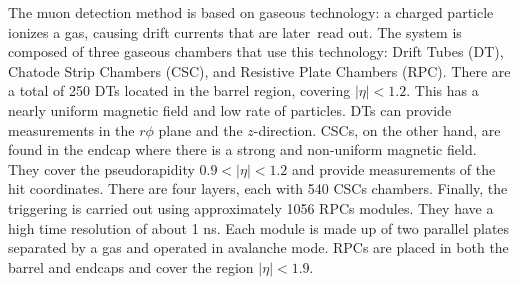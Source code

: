 The muon detection method is based on gaseous technology: a charged particle ionizes a gas, causing drift currents that are later read out. The system is composed of three gaseous chambers that use this technology: Drift Tubes (DT), Chatode Strip Chambers (CSC), and Resistive Plate Chambers (RPC). There are a total of 250 DTs located in the barrel region, covering $|\eta| < 1.2$. This has a nearly uniform magnetic field and low rate of particles. DTs can provide measurements in the $r\phi$ plane and the $z$-direction. CSCs, on the other hand, are found in the endcap where there is a strong and non-uniform magnetic field. They cover the pseudorapidity $0.9 < |\eta| < 1.2$ and provide measurements of the hit coordinates. There are four layers, each with 540 CSCs chambers. Finally, the triggering is carried out using approximately 1056 RPCs modules. They have a high time resolution of about 1 ns. Each module is made up of two parallel plates separated by a gas and operated in avalanche mode. RPCs are placed in both the barrel and endcaps and cover the region $|\eta| < 1.9$.